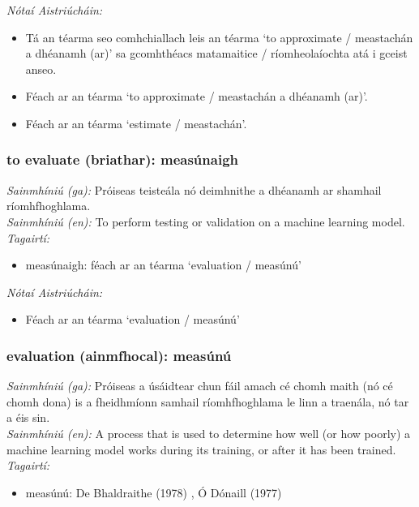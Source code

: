  \noindent \textit{Nótaí Aistriúcháin:}
\begin{itemize}
	\item Tá an téarma seo comhchiallach leis an téarma `to approximate / meastachán a dhéanamh (ar)' sa gcomhthéacs matamaitice / ríomheolaíochta atá i gceist anseo.
	\item Féach ar an téarma `to approximate / meastachán a dhéanamh (ar)'.
	\item Féach ar an téarma `estimate / meastachán'.
\end{itemize}


\subsubsection*{to evaluate (briathar): measúnaigh}
 \noindent \textit{Sainmhíniú (ga):} Próiseas teisteála nó deimhnithe a dhéanamh ar shamhail ríomhfhoghlama.
\\
 \noindent \textit{Sainmhíniú (en):} To perform testing or validation on a machine learning model.
\\
 \noindent \textit{Tagairtí:}
\begin{itemize}
	\item measúnaigh: féach ar an téarma `evaluation / measúnú'
\end{itemize}

 \noindent \textit{Nótaí Aistriúcháin:}
\begin{itemize}
	\item Féach ar an téarma `evaluation / measúnú'
\end{itemize}


\subsubsection*{evaluation (ainmfhocal): measúnú}
 \noindent \textit{Sainmhíniú (ga):} Próiseas a úsáidtear chun fáil amach cé chomh maith (nó cé chomh dona) is a fheidhmíonn samhail ríomhfhoghlama le linn a traenála, nó tar a éis sin.
\\
 \noindent \textit{Sainmhíniú (en):} A process that is used to determine how well (or how poorly) a machine learning model works during its training, or after it has been trained.
\\
 \noindent \textit{Tagairtí:}
\begin{itemize}
	\item measúnú: De Bhaldraithe (1978) \cite{de-bhaldraithe}, Ó Dónaill (1977) \cite{odonaill}
\end{itemize}

